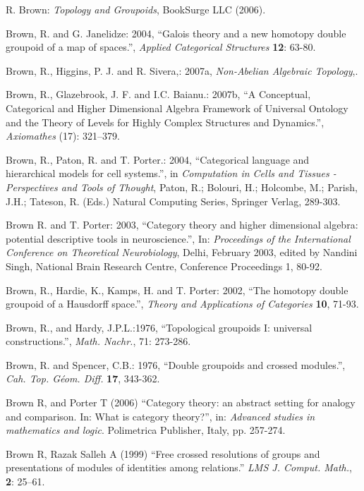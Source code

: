 \documentclass[12pt]{article}
\theoremstyle{plain}
\theoremstyle{definition}
\numberwithin{equation}{section}
\begin{document}
\begin{thebibliography}{99}
R. Brown: \emph{Topology and Groupoids}, BookSurge LLC (2006).

Brown, R. and G. Janelidze: 2004, ``Galois theory and a new homotopy
double groupoid of a map of spaces.'', \emph{Applied Categorical
Structures} \textbf{12}: 63-80.

Brown, R., Higgins, P. J. and R. Sivera,: 2007a, \emph{Non-Abelian
Algebraic Topology},.

Brown, R., Glazebrook, J. F. and I.C. Baianu.: 2007b, ``A Conceptual, Categorical and Higher Dimensional Algebra Framework of Universal Ontology and the Theory of Levels for Highly Complex Structures and Dynamics.'', \emph{Axiomathes} (17): 321--379.

Brown, R., Paton, R. and T. Porter.: 2004, ``Categorical language and
hierarchical models for cell systems.'', in \emph{Computation in
Cells and Tissues - Perspectives and Tools of Thought}, Paton, R.;
Bolouri, H.; Holcombe, M.; Parish, J.H.; Tateson, R. (Eds.)
Natural Computing Series, Springer Verlag, 289-303.

Brown R. and T. Porter: 2003, ``Category theory and higher
dimensional algebra: potential descriptive tools in neuroscience.'', In:
{\em Proceedings of the International Conference on Theoretical
Neurobiology}, Delhi, February 2003, edited by Nandini Singh,
National Brain Research Centre, Conference Proceedings 1, 80-92.

Brown, R., Hardie, K., Kamps, H. and T. Porter: 2002, ``The homotopy
double groupoid of a Hausdorff space.'', \emph{Theory and
Applications of Categories} \textbf{10}, 71-93.

Brown, R., and Hardy, J.P.L.:1976, ``Topological groupoids I:
universal constructions.'', \emph{Math. Nachr.}, 71: 273-286.

Brown, R. and Spencer, C.B.: 1976, ``Double groupoids and crossed
modules.'', \emph{Cah.  Top. G\'{e}om. Diff.} \textbf{17}, 343-362.

Brown R, and Porter T (2006) ``Category theory: an abstract setting for analogy and comparison. In: What is
category theory?'', in: {\em  Advanced studies in mathematics and logic}. Polimetrica Publisher, Italy, pp.
257-274.

Brown R, Razak Salleh A (1999) ``Free crossed resolutions of groups and presentations of modules of
identities among relations.'' {\em LMS J. Comput. Math.}, \textbf{2}: 25--61.


\end{thebibliography}
\end{document}
